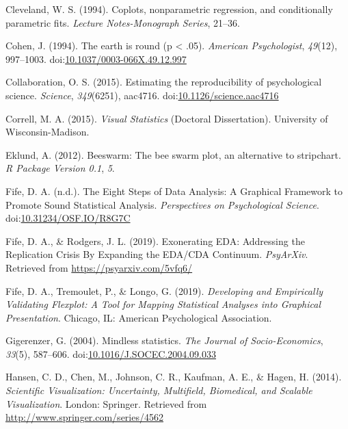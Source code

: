 \documentclass[
  doc]{apa6}
\begin{document}
\leavevmode\hypertarget{ref-Cleveland1994}{}%
Cleveland, W. S. (1994). Coplots, nonparametric regression, and conditionally parametric fits. \emph{Lecture Notes-Monograph Series}, 21--36.

\leavevmode\hypertarget{ref-cohen_earth_1994}{}%
Cohen, J. (1994). The earth is round (p \textless{} .05). \emph{American Psychologist}, \emph{49}(12), 997--1003. doi:\href{https://doi.org/10.1037/0003-066X.49.12.997}{10.1037/0003-066X.49.12.997}

\leavevmode\hypertarget{ref-open_science_collaboration_estimating_2015}{}%
Collaboration, O. S. (2015). Estimating the reproducibility of psychological science. \emph{Science}, \emph{349}(6251), aac4716. doi:\href{https://doi.org/10.1126/science.aac4716}{10.1126/science.aac4716}

\leavevmode\hypertarget{ref-Correll2015}{}%
Correll, M. A. (2015). \emph{Visual Statistics} (Doctoral Dissertation). University of Wisconsin-Madison.

\leavevmode\hypertarget{ref-eklund2012beeswarm}{}%
Eklund, A. (2012). Beeswarm: The bee swarm plot, an alternative to stripchart. \emph{R Package Version 0.1}, \emph{5}.

\leavevmode\hypertarget{ref-Fife2019e}{}%
Fife, D. A. (n.d.). The Eight Steps of Data Analysis: A Graphical Framework to Promote Sound Statistical Analysis. \emph{Perspectives on Psychological Science}. doi:\href{https://doi.org/10.31234/OSF.IO/R8G7C}{10.31234/OSF.IO/R8G7C}

\leavevmode\hypertarget{ref-Fife2019a}{}%
Fife, D. A., \& Rodgers, J. L. (2019). Exonerating EDA: Addressing the Replication Crisis By Expanding the EDA/CDA Continuum. \emph{PsyArXiv}. Retrieved from \url{https://psyarxiv.com/5vfq6/}

\leavevmode\hypertarget{ref-Fife2019d}{}%
Fife, D. A., Tremoulet, P., \& Longo, G. (2019). \emph{Developing and Empirically Validating Flexplot: A Tool for Mapping Statistical Analyses into Graphical Presentation}. Chicago, IL: American Psychological Association.

\leavevmode\hypertarget{ref-Gigerenzer2004}{}%
Gigerenzer, G. (2004). Mindless statistics. \emph{The Journal of Socio-Economics}, \emph{33}(5), 587--606. doi:\href{https://doi.org/10.1016/J.SOCEC.2004.09.033}{10.1016/J.SOCEC.2004.09.033}

\leavevmode\hypertarget{ref-Hansen}{}%
Hansen, C. D., Chen, M., Johnson, C. R., Kaufman, A. E., \& Hagen, H. (2014). \emph{Scientific Visualization: Uncertainty, Multifield, Biomedical, and Scalable Visualization}. London: Springer. Retrieved from \url{http://www.springer.com/series/4562}
\end{document}
